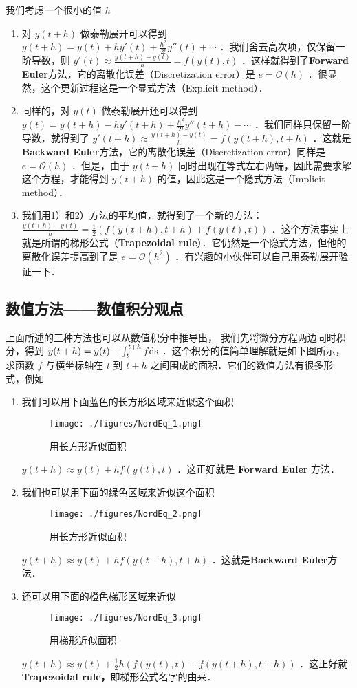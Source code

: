 我们考虑一个很小的值 $h$ 
\begin{enumerate}
\item 对 $y(t+h)$ 做泰勒展开可以得到 $y(t+h)=y(t)+hy'(t)+\frac{h^2}{2!}y''(t)+\cdots$ ．我们舍去高次项，仅保留一阶导数，则 $y'(t)\approx \frac{y(t+h)-y(t)}{h}= f(y(t),t)$ ．这样就得到了\textbf{Forward Euler}方法，它的离散化误差（Discretization error）是 $e=\mathcal{O}(h)$ ．很显然，这个更新过程这是一个显式方法（Explicit method）．
\item 同样的，对 $y(t)$ 做泰勒展开还可以得到 $y(t)=y(t+h)-hy'(t+h)+\frac{h^2}{2!}y''(t+h)-\cdots$ ．我们同样只保留一阶导数，就得到了 $y'(t+h)\approx \frac{y(t+h)-y(t)}{h}= f(y(t+h),t+h)$ ．这就是\textbf{Backward Euler}方法，它的离散化误差（Discretization error）同样是 $e=\mathcal{O}(h)$ ．但是，由于 $y(t+h)$ 同时出现在等式左右两端，因此需要求解这个方程，才能得到 $y(t+h)$ 的值，因此这是一个隐式方法（Implicit method）．
\item 我们用1）和2）方法的平均值，就得到了一个新的方法： $ \frac{y(t+h)-y(t)}{h}= \frac{1}{2}\left(f(y(t+h),t+h)+f(y(t),t)\right)$ ．这个方法事实上就是所谓的梯形公式（\textbf{Trapezoidal rule}）．它仍然是一个隐式方法，但他的离散化误差提高到了是 $e=\mathcal{O}(h^2)$ ．有兴趣的小伙伴可以自己用泰勒展开验证一下．
\end{enumerate}


\subsection{数值方法——数值积分观点}

上面所述的三种方法也可以从数值积分中推导出， 我们先将微分方程两边同时积分，得到 $y(t+h)=y(t)+\int_t^{t+h}f \rm{d}s$ ．这个积分的值简单理解就是如下图所示，求函数 $f$ 与横坐标轴在 $t$ 到 $t+h$ 之间围成的面积．它们的数值方法有很多形式，例如

\begin{enumerate}
\item 我们可以用下面蓝色的长方形区域来近似这个面积
\begin{figure}[ht]
\centering
\texttt{[image: ./figures/NordEq\_1.png]}
\caption{用长方形近似面积} \label{NordEq_fig1}
\end{figure}
$y(t+h)\approx y(t)+hf(y(t),t)$ ．这正好就是 \textbf{Forward Euler }方法．
\item 我们也可以用下面的绿色区域来近似这个面积
\begin{figure}[ht]
\centering
\texttt{[image: ./figures/NordEq\_2.png]}
\caption{用长方形近似面积} \label{NordEq_fig2}
\end{figure}
$y(t+h)\approx y(t)+hf(y(t+h),t+h)$ ．这就是\textbf{Backward Euler}方法．
\item 还可以用下面的橙色梯形区域来近似
\begin{figure}[ht]
\centering
\texttt{[image: ./figures/NordEq\_3.png]}
\caption{用梯形近似面积} \label{NordEq_fig3}
\end{figure}
$y(t+h)\approx y(t)+\frac{1}{2}h\left(f(y(t),t)+f(y(t+h),t+h)\right)$ ．这正好就\textbf{Trapezoidal rule，}即梯形公式名字的由来．
\end{enumerate}


